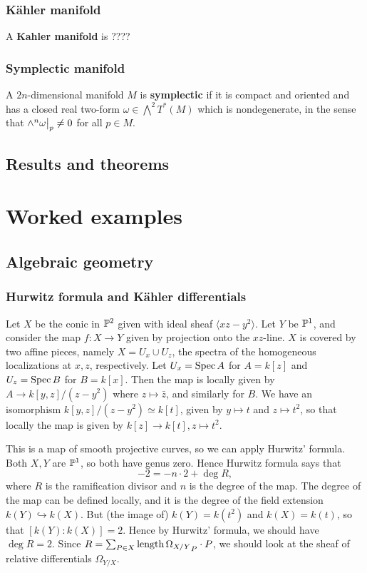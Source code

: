 \documentclass[11pt, english]{article}
\begin{document}
\subsubsection{Kähler manifold}
\label{kahlermanifold}

A \textbf{Kahler manifold} is ????

\subsubsection{Symplectic manifold}
\label{symplectic}

A $2n$-dimensional manifold $M$ is \textbf{symplectic} if it is compact and oriented and has a closed real two-form $\omega \in \bigwedge^2 T^\ast(M)$ which is nondegenerate, in the sense that $\restr{\wedge^n \omega}{p} \neq 0$ for all $p \in M$.

\subsection{Results and theorems}

\section{Worked examples}
\subsection{Algebraic geometry}
\subsubsection{Hurwitz formula and Kähler differentials}
\label{exhurwitz}

Let $X$ be the conic in $\mathbb{P}^2$ given with ideal sheaf $\langle xz-y^2 \rangle$. Let $Y$ be $\mathbb{P}^1$, and consider the map $f:X \to Y$ given by projection onto the $xz$-line. $X$ is covered by two affine pieces, namely $X= U_x \cup U_z$, the spectra of the homogeneous localizations at $x,z$, respectively. Let $U_x=\operatorname{Spec} A$ for $A=k[z]$ and $U_z = \operatorname{Spec} B$ for $B=k[x]$. Then the map is locally given by $A \to k[y,z]/(z-y^2)$ where $z \mapsto \bar z$, and similarly for $B$. We have an isomorphism $k[y,z]/(z-y^2) \simeq k[t]$, given by $y \mapsto t$ and $z \mapsto t^2$, so that locally the map is given by $k[z] \to k[t], z \mapsto t^2$.

This is a map of smooth projective curves, so we can apply Hurwitz' formula. Both $X,Y$ are $\mathbb{P}^1$, so both have genus zero. Hence Hurwitz formula says that
\[
-2 = -n \cdot 2+ \deg R,
\]
where $R$ is the ramification divisor and $n$ is the degree of the map. The degree of the map can be defined locally, and it is the degree of the field extension $k(Y) \hookrightarrow k(X)$. But (the image of) $k(Y) = k(t^2)$ and $k(X)=k(t)$, so that $[k(Y):k(X)]=2$. Hence by Hurwitz' formula, we should have $\deg R = 2$. Since $R = \sum_{P \in X} \mathrm{length} \, {\Omega_{X/Y}}_P \cdot P$, we should look at the sheaf of relative differentials $\Omega_{Y/X}$.
\end{document}
